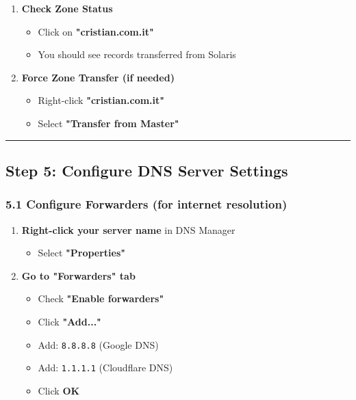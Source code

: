 \begin{enumerate}
\def\labelenumi{\arabic{enumi}.}
\tightlist
\item
  \textbf{Check Zone Status}

  \begin{itemize}
  \tightlist
  \item
    Click on \textbf{"cristian.com.it"}
  \item
    You should see records transferred from Solaris
  \end{itemize}
\item
  \textbf{Force Zone Transfer (if needed)}

  \begin{itemize}
  \tightlist
  \item
    Right-click \textbf{"cristian.com.it"}
  \item
    Select \textbf{"Transfer from Master"}
  \end{itemize}
\end{enumerate}

\begin{center}\rule{0.5\linewidth}{0.5pt}\end{center}

\subsection{Step 5: Configure DNS Server Settings}\label{step-5-configure-dns-server-settings}

\subsubsection{5.1 Configure Forwarders (for internet resolution)}\label{configure-forwarders}

\begin{enumerate}
\def\labelenumi{\arabic{enumi}.}
\tightlist
\item
  \textbf{Right-click your server name} in DNS Manager

  \begin{itemize}
  \tightlist
  \item
    Select \textbf{"Properties"}
  \end{itemize}
\item
  \textbf{Go to "Forwarders" tab}

  \begin{itemize}
  \tightlist
  \item
    Check \textbf{"Enable forwarders"}
  \item
    Click \textbf{"Add..."}
  \item
    Add: \texttt{8.8.8.8} (Google DNS)
  \item
    Add: \texttt{1.1.1.1} (Cloudflare DNS)
  \item
    Click \textbf{OK}
  \end{itemize}
\end{enumerate}

